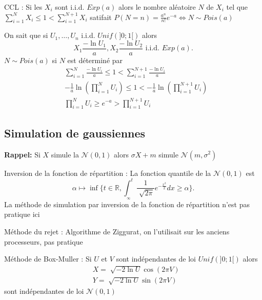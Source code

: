 \documentclass{article}
\theoremstyle{plain}%
\theoremstyle{definition}
\theoremstyle{remark}
\begin{document}
CCL : Si les $ X_i $ sont i.i.d. $ Exp(a) $ alors le nombre aléatoire $ N $ de $ X_i $ tel que $ \sum_{i=1}^{N}X_i \leq 1 < \sum_{i=1}^{N+1}X_i $ satifait $ P(N=n) = \frac{a^n}{n!}e^{-a} \Leftrightarrow N \sim Pois(a)$ 

On sait que si $ U_1, \dots, U_n $ i.i.d. $ Unif(]0;1[) $ alors 
\[
	X_1 \frac{-\ln U_1}{a}, X_2 \frac{-\ln U_2}{a} \text{ i.i.d. } Exp(a)
.\]
$ N \sim Pois(a) $ si $ N $ est déterminé par
\begin{align*}
	& \sum_{i=1}^{N} \frac{-\ln U_i}{a} \leq 1 < \sum_{i=1}^{N+1} \frac{-\ln U_i}{a} \\
	& -\frac{1}{a}\ln (\prod_{i=1}^{N}U_i) \leq 1 < - \frac{1}{a}\ln (\prod_{i=1}^{N+1}U_i) \\
	& \prod_{i=1}^{N}U_i \geq e^{-a} > \prod_{i=1}^{N+1}U_i
\end{align*}

\subsection{Simulation de gaussiennes}
\textbf{Rappel: } Si $ X $ simule la $ \mathcal{N}(0,1) $ alors $ \sigma X + m $ simule $ \mathcal{N}(m, \sigma ^2) $ 

Inversion de la fonction de répartition : La fonction quantile de la $ \mathcal{N}(0,1) $ est 
\[
	\alpha \mapsto \inf \{t \in \mathbb{R}, \int_{_\infty }^{t} \frac{1}{\sqrt[]{2 \pi }} e^{- \frac{x^2}{2}} dx \geq \alpha \}
.\]
La méthode de simulation par inversion de la fonction de répartition n'est pas pratique ici

Méthode du rejet : Algorithme de Ziggurat, on l'utilisait sur les anciens processeurs, pas pratique 

Méthode de Box-Muller : Si $ U $ et $ V $ sont indépendantes de loi $ Unif(]0;1[) $ alors
\begin{align*}
	& X=\sqrt[]{-2 \ln U} \cos(2 \pi V) \\
	& Y=\sqrt[]{-2 \ln U} \sin (2 \pi V)
\end{align*}
sont indépendantes de loi $ \mathcal{N}(0,1) $ 
\end{document}

